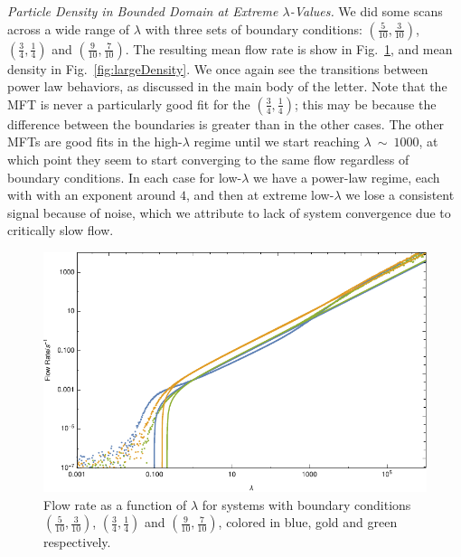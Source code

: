 \documentclass[
reprint,
 amsmath,amssymb,
 aps,
 prl,
]{revtex4-1}
\begin{document}
\textit{Particle Density in Bounded Domain at Extreme $\lambda$-Values.}
We did some scans across a wide range of $\lambda$ with three sets of boundary conditions: $(\frac{5}{10}, \frac{3}{10})$, $(\frac{3}{4}, \frac{1}{4})$ and $(\frac{9}{10}, \frac{7}{10})$. The resulting mean flow rate is show in
Fig.~\ref{fig:largeFlow}, and mean density in Fig.~\ref{fig:largeDensity}. We once again see the transitions between power law behaviors, as discussed in the main body of the letter. Note that the MFT is never a particularly good
fit for the $(\frac{3}{4}, \frac{1}{4})$; this may be because the difference between the boundaries is greater than in the other cases. The other MFTs are good fits in the high-$\lambda$ regime until we start reaching $\lambda~\sim~1000$,
at which point they seem to start converging to the same flow regardless of boundary conditions. In each case for low-$\lambda$ we have a power-law regime, each with with an exponent around $4$, and then at extreme low-$\lambda$ we lose
a consistent signal because of noise, which we attribute to lack of system convergence due to critically slow flow.
\begin{figure}[h!]
\vspace{1em}
\caption{\label{fig:largeFlow} Flow rate as a function of $\lambda$ for systems with boundary conditions $(\frac{5}{10}, \frac{3}{10})$, $(\frac{3}{4}, \frac{1}{4})$ and $(\frac{9}{10}, \frac{7}{10})$, colored in blue, gold and green
respectively.}
    \includegraphics[width=0.95\linewidth]{images/largeRangeFlow}
    \vspace{0em}
\end{figure}
\end{document}
